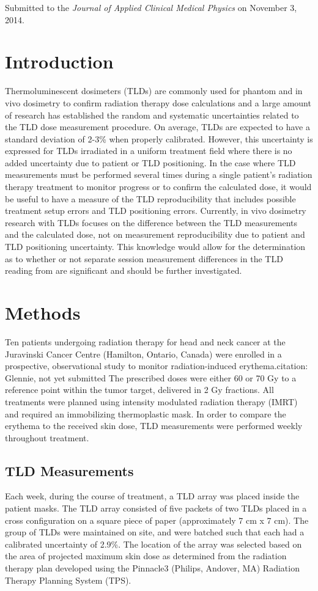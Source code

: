 \noindent Submitted to the \textit{Journal of Applied Clinical Medical Physics} on November 3, 2014.

\section{Introduction}
Thermoluminescent dosimeters (TLDs) are commonly used for phantom and in vivo dosimetry to confirm radiation therapy dose calculations\cite{Essers1999,Mijnheer2013} and a large amount of research has established the random and systematic uncertainties related to the TLD dose measurement procedure.\cite{Kirby1992,Mijnheer1987} On average, TLDs are expected to have a standard deviation of 2-3\% when properly calibrated.\cite{Essers1999,Ostwald1995} However, this uncertainty is expressed for TLDs irradiated in a uniform treatment field where there is no added uncertainty due to patient or TLD positioning. In the case where TLD measurements must be performed several times during a single patient’s radiation therapy treatment to monitor progress or to confirm the calculated dose, it would be useful to have a measure of the TLD reproducibility that includes possible treatment setup errors and TLD positioning errors. Currently, in vivo dosimetry research with TLDs focuses on the difference between the TLD measurements and the calculated dose,\cite{Ruden1976,Leunens1990,Tung2004} not on measurement reproducibility due to patient and TLD positioning uncertainty. This knowledge would allow for the determination as to whether or not separate session measurement differences in the TLD reading from are significant and should be further investigated.

\section{Methods}
Ten patients undergoing radiation therapy for head and neck cancer at the Juravinski Cancer Centre (Hamilton, Ontario, Canada) were enrolled in a prospective, observational study to monitor radiation-induced erythema.{citation: Glennie, not yet submitted} The prescribed doses were either 60 or 70 Gy to a reference point within the tumor target, delivered in 2 Gy fractions. All treatments were planned using intensity modulated radiation therapy (IMRT) and required an immobilizing thermoplastic mask. In order to compare the erythema to the received skin dose, TLD measurements were performed weekly throughout treatment.

\subsection{TLD Measurements}
Each week, during the course of treatment, a TLD array was placed inside the patient masks. The TLD array consisted of five packets of two TLDs placed in a cross configuration on a square piece of paper (approximately 7 cm x 7 cm). The group of TLDs were maintained on site, and were batched such that each had a calibrated uncertainty of 2.9\%. The location of the array was selected based on the area of projected maximum skin dose as determined from the radiation therapy plan developed using the Pinnacle3 (Philips, Andover, MA) Radiation Therapy Planning System (TPS).

